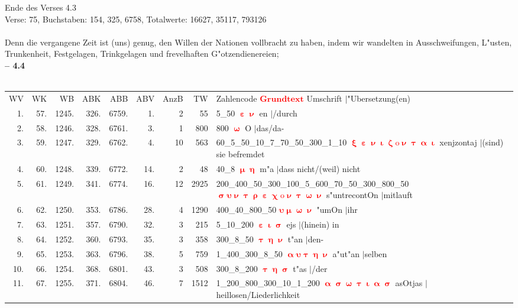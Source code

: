 \documentclass[a4paper,10pt,landscape]{article}
\begin{document}
Ende des Verses 4.3\\
Verse: 75, Buchstaben: 154, 325, 6758, Totalwerte: 16627, 35117, 793126\\
\\
Denn die vergangene Zeit ist (uns) genug, den Willen der Nationen vollbracht zu haben, indem wir wandelten in Ausschweifungen, L"usten, Trunkenheit, Festgelagen, Trinkgelagen und frevelhaften G"otzendienereien;\\
\newpage 
{\bf -- 4.4}\\
\medskip \\
\begin{tabular}{rrrrrrrrp{120mm}}
WV&WK&WB&ABK&ABB&ABV&AnzB&TW&Zahlencode \textcolor{red}{$\boldsymbol{Grundtext}$} Umschrift $|$"Ubersetzung(en)\\
1.&57.&1245.&326.&6759.&1.&2&55&5\_50 \textcolor{red}{$\boldsymbol{\upepsilon\upnu}$} en $|$/durch\\
2.&58.&1246.&328.&6761.&3.&1&800&800 \textcolor{red}{$\boldsymbol{\upomega}$} O $|$das/da-\\
3.&59.&1247.&329.&6762.&4.&10&563&60\_5\_50\_10\_7\_70\_50\_300\_1\_10 \textcolor{red}{$\boldsymbol{\upxi\upepsilon\upnu\upiota\upzeta\mathrm{o}\upnu\uptau\upalpha\upiota}$} xenjzontaj $|$(sind) sie befremdet\\
4.&60.&1248.&339.&6772.&14.&2&48&40\_8 \textcolor{red}{$\boldsymbol{\upmu\upeta}$} m"a $|$dass nicht/(weil) nicht\\
5.&61.&1249.&341.&6774.&16.&12&2925&200\_400\_50\_300\_100\_5\_600\_70\_50\_300\_800\_50 \textcolor{red}{$\boldsymbol{\upsigma\upsilon\upnu\uptau\uprho\upepsilon\upchi\mathrm{o}\upnu\uptau\upomega\upnu}$} s"untrecontOn $|$mitlauft\\
6.&62.&1250.&353.&6786.&28.&4&1290&400\_40\_800\_50 \textcolor{red}{$\boldsymbol{\upsilon\upmu\upomega\upnu}$} "umOn $|$ihr\\
7.&63.&1251.&357.&6790.&32.&3&215&5\_10\_200 \textcolor{red}{$\boldsymbol{\upepsilon\upiota\upsigma}$} ejs $|$(hinein) in\\
8.&64.&1252.&360.&6793.&35.&3&358&300\_8\_50 \textcolor{red}{$\boldsymbol{\uptau\upeta\upnu}$} t"an $|$den-\\
9.&65.&1253.&363.&6796.&38.&5&759&1\_400\_300\_8\_50 \textcolor{red}{$\boldsymbol{\upalpha\upsilon\uptau\upeta\upnu}$} a"ut"an $|$selben\\
10.&66.&1254.&368.&6801.&43.&3&508&300\_8\_200 \textcolor{red}{$\boldsymbol{\uptau\upeta\upsigma}$} t"as $|$/der\\
11.&67.&1255.&371.&6804.&46.&7&1512&1\_200\_800\_300\_10\_1\_200 \textcolor{red}{$\boldsymbol{\upalpha\upsigma\upomega\uptau\upiota\upalpha\upsigma}$} asOtjas $|$heillosen/Liederlichkeit\\

\end{tabular}
\end{document}
